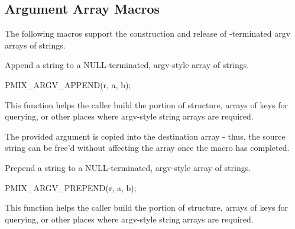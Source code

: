 \subsection{Argument Array Macros}

The following macros support the construction and release of -terminated argv arrays of strings.


Append a string to a NULL-terminated, argv-style array of strings.

\cspecificstart
\begin{codepar}
PMIX_ARGV_APPEND(r, a, b);
\end{codepar}
\cspecificend

\begin{arglist}
\end{arglist}

This function helps the caller build the  portion of  structure, arrays of keys for querying, or other places where argv-style string arrays are required.

\adviceuserstart
The provided argument is copied into the destination array - thus, the source string can be free'd without affecting the array once the macro has completed.
\adviceuserend


Prepend a string to a NULL-terminated, argv-style array of strings.

\cspecificstart
\begin{codepar}
PMIX_ARGV_PREPEND(r, a, b);
\end{codepar}
\cspecificend

\begin{arglist}
\end{arglist}

This function helps the caller build the  portion of  structure, arrays of keys for querying, or other places where argv-style string arrays are required.

